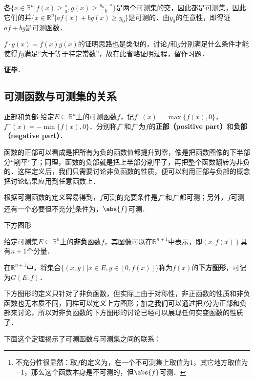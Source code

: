 各$\{x\in\mathbb{R}^n|f(x)\geq \frac{s}{a}, g(x)\geq \frac{y_0-s}{b}\}$是两个可测集的交，因此都是可测集，因此它们的并$\{x\in\mathbb{R}^n|af(x)+bg(x)\geq y_0\}$是可测的．由$y_0$的任意性，即得证$af+bg$是可测函数．

$f\cdot g(x)=f(x)g(x)$的证明思路也是类似的，讨论$f$和$g$分别满足什么条件才能使得$fg$满足“大于等于特定常数”，故在此省略证明过程，留作习题．


\textbf{证毕}．




\subsection{可测函数与可测集的关系}




\begin{definition}{正部和负部}
给定$E\subseteq\mathbb{R}^n$上的可测函数$f$，记$f^+(x)=\max\{f(x), 0\}$，$f^-(x)=-\min\{f(x), 0\}$．分别称$f^+$和$f^-$为$f$的\textbf{正部（positive part）}和\textbf{负部（negative part）}．
\end{definition}

函数的正部可以看成是把所有为负的函数值都提升到零，像是把函数图像的下半部分“削平”了；同理，函数的负部就是把上半部分削平了，再把整个函数翻转为非负的．这样定义后，我们只需要讨论非负函数的性质，便可以利用正部与负部的概念把讨论结果应用到任意函数上．

根据可测函数的定义容易得到，$f$可测的充要条件是$f^+$和$f^-$都可测；另外，$f$可测还有一个必要但不充分\footnote{不充分性很显然：取$f$的定义为，在一个不可测集上取值为$1$，其它地方取值为$-1$，那么这个函数本身是不可测的，但$\abs{f}$可测．}条件为，$\abs{f}$可测．

\begin{definition}{下方图形}\label{MsbFun_def2}

给定可测集$E\subseteq\mathbb{R}^n$上的\textbf{非负}函数$f$，其图像可以在$\mathbb{R}^{n+1}$中表示，即$(x, f(x))$具有$n+1$个分量．

在$\mathbb{R}^{n+1}$中，将集合$\{(x, y)|x\in E, y\in [0, f(x)]\}$称为$f(x)$的\textbf{下方图形}，可记为$G(E; f)$．

\end{definition}

下方图形的定义只针对了非负函数，但实际上由于对称性，非正函数的性质和非负函数也无本质不同，同样可以定义上方图形；加之我们可以通过把$f$分为正部和负部来讨论，所以对非负函数的下方图形的讨论已经可以展现任何实变函数的性质了．

下面这个定理揭示了可测函数与可测集之间的联系：

